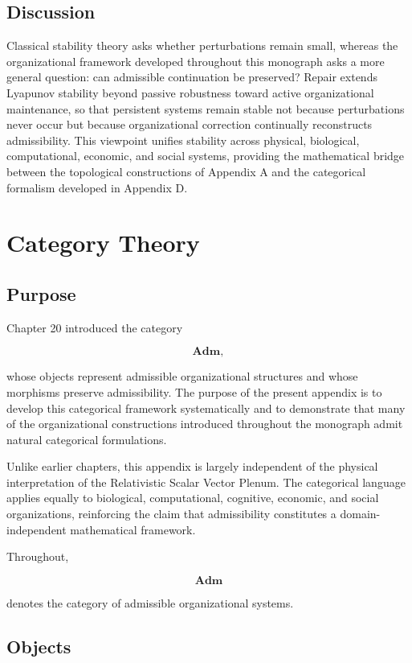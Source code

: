 \documentclass[11pt,oneside]{book}
\numberwithin{equation}{chapter}
\theoremstyle{definition}
\theoremstyle{plain}
\begin{document}
\section{Discussion}

Classical stability theory asks whether perturbations remain small, whereas the organizational framework developed throughout this monograph asks a more general question: can admissible continuation be preserved? Repair extends Lyapunov stability beyond passive robustness toward active organizational maintenance, so that persistent systems remain stable not because perturbations never occur but because organizational correction continually reconstructs admissibility. This viewpoint unifies stability across physical, biological, computational, economic, and social systems, providing the mathematical bridge between the topological constructions of Appendix A and the categorical formalism developed in Appendix D.

\chapter{Category Theory}

\section{Purpose}

Chapter 20 introduced the category

\[
\mathbf{Adm},
\]

whose objects represent admissible organizational structures and whose
morphisms preserve admissibility. The purpose of the present appendix is
to develop this categorical framework systematically and to demonstrate
that many of the organizational constructions introduced throughout the
monograph admit natural categorical formulations.

Unlike earlier chapters, this appendix is largely independent of the
physical interpretation of the Relativistic Scalar Vector Plenum. The
categorical language applies equally to biological, computational,
cognitive, economic, and social organizations, reinforcing the claim that
admissibility constitutes a domain-independent mathematical framework.

Throughout,

\[
\mathbf{Adm}
\]

denotes the category of admissible organizational systems.

\section{Objects}
\end{document}
